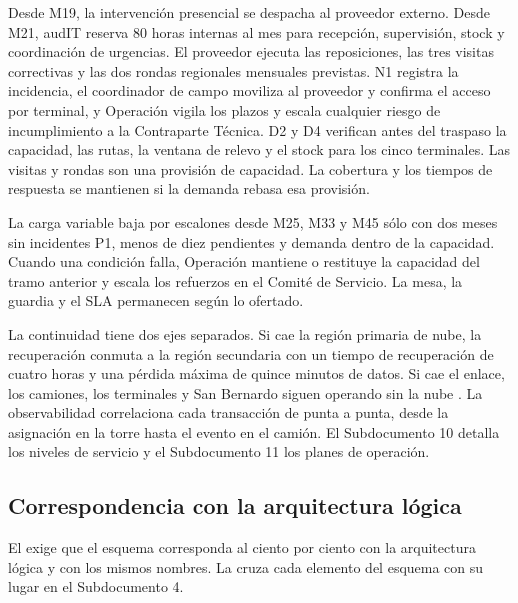 Desde M19, la intervención presencial se despacha al proveedor externo. Desde M21, audIT reserva
80 horas internas al mes para recepción, supervisión, stock y coordinación de urgencias. El
proveedor ejecuta las reposiciones, las tres visitas correctivas y las dos rondas regionales
mensuales previstas. N1 registra la incidencia, el coordinador de campo moviliza al proveedor
y confirma el acceso por terminal, y Operación vigila los plazos y escala cualquier riesgo de
incumplimiento a la Contraparte Técnica. D2 y D4 verifican antes del traspaso la capacidad, las rutas,
la ventana de relevo y el stock para los cinco terminales. Las visitas y rondas son una provisión
de capacidad. La cobertura y los tiempos de respuesta se mantienen si la demanda rebasa esa
provisión.

La carga variable baja por escalones desde M25, M33 y M45 sólo con dos meses sin incidentes P1,
menos de diez pendientes y demanda dentro de la capacidad. Cuando una condición falla, Operación
mantiene o restituye la capacidad del tramo anterior y escala los refuerzos en el Comité de
Servicio. La mesa, la guardia y el SLA permanecen según lo ofertado.

La continuidad tiene dos ejes separados. Si cae la región primaria de nube, la recuperación conmuta a la
región secundaria con un tiempo de recuperación de cuatro horas y una pérdida máxima de quince minutos de
datos. Si cae el enlace, los camiones, los terminales y San Bernardo siguen operando sin la nube
. La observabilidad correlaciona cada transacción de punta a punta, desde
la asignación en la torre hasta el evento en el camión. El Subdocumento 10 detalla los niveles de
servicio y el Subdocumento 11 los planes de operación.

\subsection{Correspondencia con la arquitectura lógica}\label{sec:3-mapeo}

El  exige que el esquema corresponda al ciento por ciento con la arquitectura
lógica y con los mismos nombres. La  cruza cada elemento del esquema con su lugar en el
Subdocumento 4.

